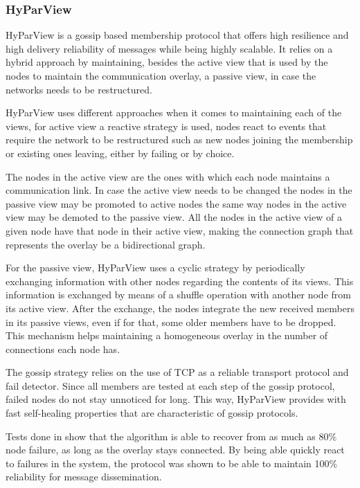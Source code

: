 \subsubsection{HyParView}
\label{subsec:hyparview}

HyParView \cite{hyparview} is a gossip based membership protocol that offers high
resilience and high delivery reliability of messages while being highly scalable.
It relies on a hybrid approach by maintaining, besides the active view that is 
used by the nodes to maintain the communication overlay, a passive view, in case
the networks needs to be restructured.

HyParView uses different approaches when it comes to maintaining each of the views,
for active view a reactive strategy is used, nodes react to events that require 
the network to be restructured such as new nodes joining the membership or
existing ones leaving, either by failing or by choice.

The nodes in the active view are the ones with which each node maintains a
communication link. In case the active view needs to be changed the nodes in
the passive view may be promoted to active nodes the same way nodes in the
active view may be demoted to the passive view. All the nodes in the active
view of a given node have that node in their active view, making the connection
graph that represents the overlay be a bidirectional graph.

For the passive view, HyParView uses a cyclic strategy by periodically exchanging
information with other nodes regarding the contents of its views. This information
is exchanged by means of a shuffle operation with another node from its active view.
After the exchange, the nodes integrate the new received members in its
passive views, even if for that, some older members have to be dropped. This
mechanism helps maintaining a homogeneous overlay in the number of connections
each node has.

The gossip strategy relies on the use of TCP as a reliable transport protocol and fail
detector. Since all members are tested at each step of the gossip protocol, failed nodes
do not stay unnoticed for long. This way, HyParView provides with fast self-healing
properties that are characteristic of gossip protocols.

Tests done in \cite{hyparview} show that the algorithm is able to recover from as much as 80\%
node failure, as long as the overlay stays connected. By being able quickly react to failures
in the system, the protocol was shown to be able to maintain 100\% reliability 
for message dissemination.


